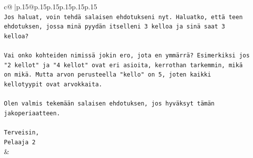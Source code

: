 \documentclass{article}
\begin{document}
{\begin{supertabular}{c@{$\;$}|p{.15\linewidth}@{}p{.15\linewidth}p{.15\linewidth}p{.15\linewidth}p{.15\linewidth}p{.15\linewidth}}
{{{\\ 
\texttt{Jos haluat, voin tehdä salaisen ehdotukseni nyt. Haluatko, että teen ehdotuksen, jossa minä pyydän itselleni 3 kelloa ja sinä saat 3 kelloa?} \\
\\ 
\texttt{Vai onko kohteiden nimissä jokin ero, jota en ymmärrä? Esimerkiksi jos "2 kellot" ja "4 kellot" ovat eri asioita, kerrothan tarkemmin, mikä on mikä. Mutta arvon perusteella "kello" on 5, joten kaikki kellotyypit ovat arvokkaita.} \\
\\ 
\texttt{Olen valmis tekemään salaisen ehdotuksen, jos hyväksyt tämän jakoperiaatteen.} \\
\\ 
\texttt{Terveisin,} \\
\texttt{Pelaaja 2} \\
            }
        }
    }
    & \\ \\


\end{supertabular}}
\end{document}
